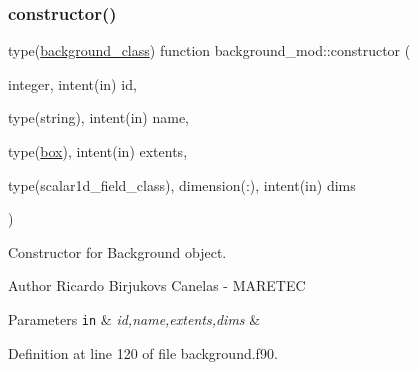 \subsubsection{\texorpdfstring{constructor()}{constructor()}}
{\footnotesize\ttfamily type(\mbox{\hyperlink{structbackground__mod_1_1background__class}{background\+\_\+class}}) function background\+\_\+mod\+::constructor (\begin{DoxyParamCaption}\item[{integer, intent(in)}]{id,  }\item[{type(string), intent(in)}]{name,  }\item[{type(\mbox{\hyperlink{structgeometry__mod_1_1box}{box}}), intent(in)}]{extents,  }\item[{type(scalar1d\+\_\+field\+\_\+class), dimension(\+:), intent(in)}]{dims }\end{DoxyParamCaption})\hspace{0.3cm}{\ttfamily [private]}}



Constructor for Background object. 

\begin{DoxyAuthor}{Author}
Ricardo Birjukovs Canelas -\/ M\+A\+R\+E\+T\+EC 
\end{DoxyAuthor}

\begin{DoxyParams}[1]{Parameters}
\mbox{\tt in}  & {\em id,name,extents,dims} & \\
\hline
\end{DoxyParams}


Definition at line 120 of file background.\+f90.



